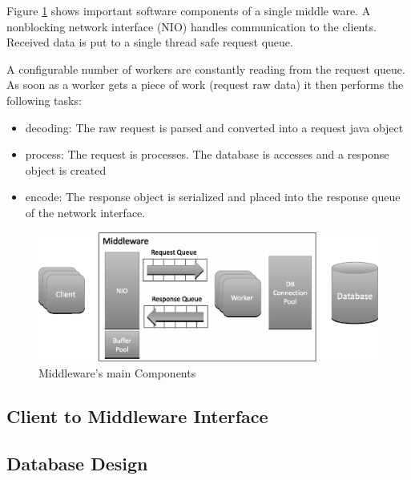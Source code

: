 \documentclass[a4paper]{article}
\begin{document}
Figure \ref{fig:middleware-threading} shows important software components of a single middle ware. A nonblocking network interface (NIO) handles communication to the clients. Received data is put to a single thread safe request queue.

A configurable number of workers are constantly reading from the request queue. As soon as a worker gets a piece of work (request raw data) it then performs the following tasks:
\begin{itemize}
\item decoding: The raw request is parsed and converted into a request java object
\item process: The request is processes. The database is accesses and a response object is created
\item encode: The response object is serialized and placed into the response queue of the network interface.
\end{itemize}


\begin{figure}[H]
	\begin{center}
    \includegraphics[scale=0.5]{../drawings/broker-threading.eps}
  \end{center}
  \caption{Middleware's main Components}
  \label{fig:middleware-threading}
\end{figure}

\subsection{Client to Middleware Interface}



\subsection{Database Design}
\end{document}

